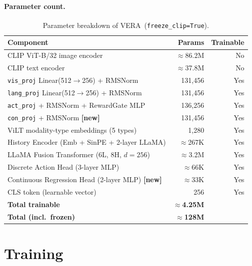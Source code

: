 \documentclass{article}
\newcommand{\modelname}{\textsc{VERA}\xspace}
\newcommand{\NEW}{\textcolor{NewOrange}{\textbf{[new]}}\xspace}
\begin{document}
\paragraph{Parameter count.}

\begin{table}[h]
\centering
\caption{Parameter breakdown of \modelname\ (\texttt{freeze\_clip=True}).}
\label{tab:params}
\small
\begin{tabular}{lrr}
\toprule
\textbf{Component} & \textbf{Params} & \textbf{Trainable} \\
\midrule
CLIP ViT-B/32 image encoder         & $\approx$86.2M & No  \\
CLIP text encoder                    & $\approx$37.8M & No  \\
\midrule
\texttt{vis\_proj} Linear(512$\to$256) + RMSNorm     & 131,456 & Yes \\
\texttt{lang\_proj} Linear(512$\to$256) + RMSNorm    & 131,456 & Yes \\
\texttt{act\_proj} + RMSNorm + RewardGate MLP        & 136,256 & Yes \\
\texttt{con\_proj} + RMSNorm \NEW                    & 131,456 & Yes \\
ViLT modality-type embeddings (5 types)              & 1,280   & Yes \\
History Encoder (Emb + SinPE + 2-layer LLaMA)        & $\approx$267K  & Yes \\
LLaMA Fusion Transformer (6L, 8H, $d{=}256$)         & $\approx$3.2M  & Yes \\
Discrete Action Head (3-layer MLP)                   & $\approx$66K   & Yes \\
Continuous Regression Head (2-layer MLP) \NEW        & $\approx$33K   & Yes \\
CLS token (learnable vector)                         & 256     & Yes \\
\midrule
\textbf{Total trainable}                             & $\approx$\textbf{4.25M} & \\
\textbf{Total (incl.\ frozen)}                       & $\approx$\textbf{128M} & \\
\bottomrule
\end{tabular}
\end{table}

\section{Training}
\label{sec:training}
\end{document}
